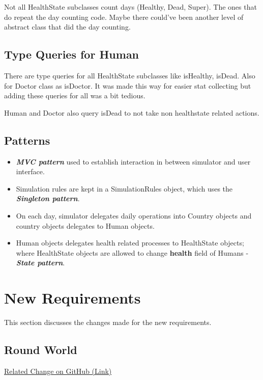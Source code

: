 \documentclass[]{article}
\providecommand{\tightlist}{%
  \setlength{\itemsep}{0pt}\setlength{\parskip}{0pt}}
\begin{document}
Not all HealthState subclasses count days (Healthy, Dead, Super). The
ones that do repeat the day counting code. Maybe there could've been
another level of abstract class that did the day counting.

\subsection{Type Queries for Human}\label{type-queries-for-human}

There are type queries for all HealthState subclasses like isHealthy,
isDead. Also for Doctor class as isDoctor. It was made this way for
easier stat collecting but adding these queries for all was a bit
tedious.

Human and Doctor also query isDead to not take non healthstate related
actions.

\subsection{Patterns}\label{patterns}

\begin{itemize}
\tightlist
\item
  \textbf{\emph{MVC pattern}} used to establish interaction in between
  simulator and user interface.
\item
  Simulation rules are kept in a SimulationRules object, which uses the
  \textbf{\emph{Singleton pattern}}.
\item
  On each day, simulator delegates daily operations into Country objects
  and country objects delegates to Human objects.
\item
  Human objects delegates health related processes to HealthState
  objects; where HealthState objects are allowed to change
  \textbf{health} field of Humans -\textbf{\emph{State pattern}}.
\end{itemize}

\section{New Requirements}\label{new-requirements}

This section discusses the changes made for the new requirements.

\subsection{Round World}\label{round-world}

\href{https://github.com/ozusrl/CS534-kivanccakmak-okanpalaz/commit/824cb1fdc5306ff98c4ce2375f623f892dedcf70}{Related
Change on GitHub (Link)}
\end{document}

